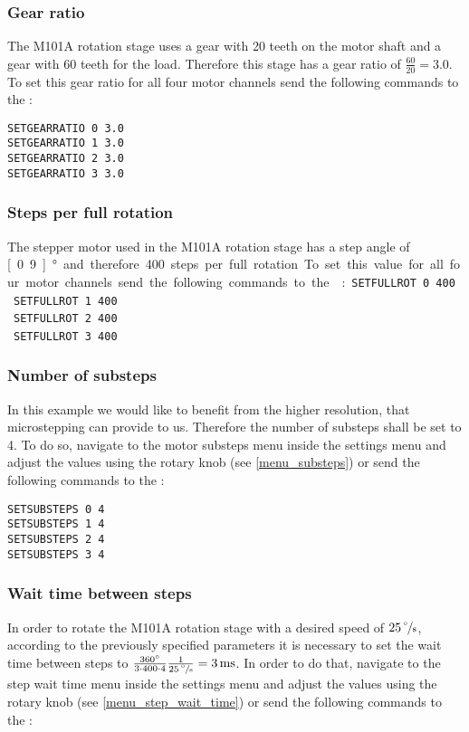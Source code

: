 \subsubsection{Gear ratio}
The M101A rotation stage uses a gear with 20 teeth on the motor shaft and a gear with 60 teeth for the load. Therefore this stage has a gear ratio of $\frac{60}{20} = 3.0$. To set this gear ratio for all four motor channels send the following commands to the \productName :

\texttt{SETGEARRATIO 0 3.0}\\
\texttt{SETGEARRATIO 1 3.0}\\
\texttt{SETGEARRATIO 2 3.0}\\
\texttt{SETGEARRATIO 3 3.0}

\subsubsection{Steps per full rotation}
The stepper motor used in the M101A rotation stage has a step angle of \unit[0.9]{°} and therefore 400 steps per full rotation. To set this value for all four motor channels send the following commands to the \productName :

\texttt{SETFULLROT 0 400}\\
\texttt{SETFULLROT 1 400}\\
\texttt{SETFULLROT 2 400}\\
\texttt{SETFULLROT 3 400}

\subsubsection{Number of substeps}
In this example we would like to benefit from the higher resolution, that microstepping can provide to us. Therefore the number of substeps shall be set to 4. To do so, navigate to the motor substeps menu inside the settings menu and adjust the values using the rotary knob (see \ref{menu_substeps}) or send the following commands to the \productName :

\texttt{SETSUBSTEPS 0 4}\\
\texttt{SETSUBSTEPS 1 4}\\
\texttt{SETSUBSTEPS 2 4}\\
\texttt{SETSUBSTEPS 3 4}

\subsubsection{Wait time between steps}
In order to rotate the M101A rotation stage with a desired speed of $\unit[25]{\nicefrac{^{\circ}}{s}}$, according to the previously specified parameters it is necessary to set the wait time between steps to $\frac{360^{\circ}}{3 \cdot 400 \cdot 4} \frac{1}{\unit[25]{\nicefrac{^{\circ}}{s}}} =  \unit[3]{ms}$. In order to do that, navigate to the step wait time menu inside the settings menu and adjust the values using the rotary knob (see \ref{menu_step_wait_time}) or send the following commands to the \productName : 

